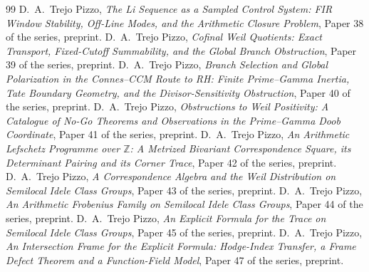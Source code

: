 \documentclass[11pt]{amsart}
\theoremstyle{definition}
\theoremstyle{remark}
\numberwithin{equation}{section}
\newcommand{\Z}{\mathbb{Z}}
\begin{document}
\begin{thebibliography}{99}
 D.~A.~Trejo Pizzo, \emph{The Li Sequence as a Sampled Control System: FIR Window Stability, Off-Line Modes, and the Arithmetic Closure Problem}, Paper 38 of the series, preprint.
 D.~A.~Trejo Pizzo, \emph{Cofinal Weil Quotients: Exact Transport, Fixed-Cutoff Summability, and the Global Branch Obstruction}, Paper 39 of the series, preprint.
 D.~A.~Trejo Pizzo, \emph{Branch Selection and Global Polarization in the Connes--CCM Route to RH: Finite Prime--Gamma Inertia, Tate Boundary Geometry, and the Divisor-Sensitivity Obstruction}, Paper 40 of the series, preprint.
 D.~A.~Trejo Pizzo, \emph{Obstructions to Weil Positivity: A Catalogue of No-Go Theorems and Observations in the Prime--Gamma Doob Coordinate}, Paper 41 of the series, preprint.
 D.~A.~Trejo Pizzo, \emph{An Arithmetic Lefschetz Programme over $\Z$: A Metrized Bivariant Correspondence Square, its Determinant Pairing and its Corner Trace}, Paper 42 of the series, preprint.
 D.~A.~Trejo Pizzo, \emph{A Correspondence Algebra and the Weil Distribution on Semilocal Idele Class Groups}, Paper 43 of the series, preprint.
 D.~A.~Trejo Pizzo, \emph{An Arithmetic Frobenius Family on Semilocal Idele Class Groups}, Paper 44 of the series, preprint.
 D.~A.~Trejo Pizzo, \emph{An Explicit Formula for the Trace on Semilocal Idele Class Groups}, Paper 45 of the series, preprint.
 D.~A.~Trejo Pizzo, \emph{An Intersection Frame for the Explicit Formula: Hodge-Index Transfer, a Frame Defect Theorem and a Function-Field Model}, Paper 47 of the series, preprint.
\end{thebibliography}
\end{document}
